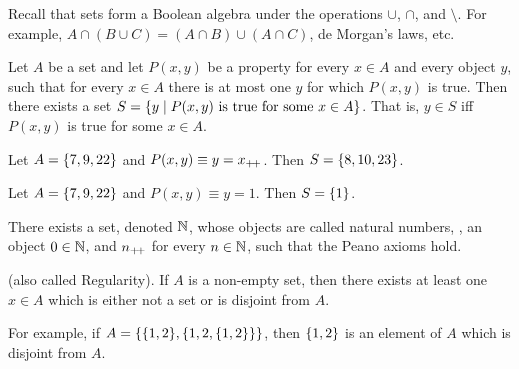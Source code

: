 Recall that sets form a Boolean algebra under the operations $\cup$, $\cap$, and
$\setminus$.
For example, $A \cap (B \cup C) = (A \cap B) \cup (A \cap C)$, de Morgan's laws,
etc.

\begin{axiom}[Replacement] \label{def:zfc:replacement}
    Let $A$ be a set and let $P(x, y)$ be a property for every $x \in A$ and
    every object $y$, such that for every $x \in A$ there is at most one $y$ for
    which $P(x, y)$ is true.
    Then there exists a set $S = \set{y \mid P(x, y) \text{ is true for some }
    x \in A}$.
    That is, $y \in S$ iff $P(x, y)$ is true for some $x \in A$.
\end{axiom}
\begin{examples}
    \item Let $A = \set{7, 9, 22}$ and $P(x, y) \equiv y = x_{+\!+}$.
    Then $S = \set{8, 10, 23}$.
    \item Let $A = \set{7, 9, 22}$ and $P(x, y) \equiv y = 1$.
    Then $S = \set{1}$.
\end{examples}

\begin{axiom}[Infinity] \label{def:zfc:infinity}
    There exists a set, denoted $\mathbb{N}$, whose objects are called natural numbers,
    \ie, an object $0 \in \mathbb{N}$, and $n_{+\!+}$ for every $n \in \mathbb{N}$, such that the
    Peano axioms hold.
\end{axiom}

\begin{axiom}[Foundation] \label{def:zfc:foundation}
    (also called Regularity).
    If $A$ is a non-empty set, then there exists at least one $x \in A$ which
    is either not a set or is disjoint from $A$.
\end{axiom}
For example, if $A = \set{\set{1, 2}, \set{1, 2, \set{1, 2}}}$, then
$\set{1, 2}$ is an element of $A$ which is disjoint from $A$.
